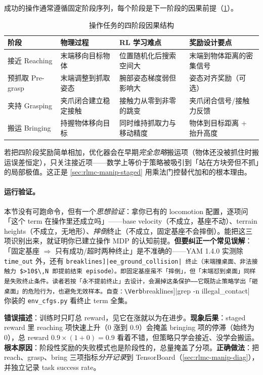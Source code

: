 成功的操作通常遵循固定阶段序列，每个阶段是下一阶段的因果前提（\cref{tab:rlmc-manip-stages}）。

\begin{table}[ht]
\centering
\small
\caption{操作任务的四阶段因果结构}
\label{tab:rlmc-manip-stages}
\begin{tabular}{@{}llll@{}}
\toprule
阶段 & 物理过程 & RL 学习难点 & 奖励设计要点 \\
\midrule
接近 Reaching & 末端移向目标物体 & 位置随机化后搜索空间大 & 末端到物体距离的密集信号 \\
预抓取 Pre-grasp & 末端调整到抓取姿态 & 腕部姿态梯度弱但影响大 & 姿态对齐奖励（可选） \\
夹持 Grasping & 夹爪闭合建立稳定接触 & 接触力从零到非零的跳变 & 夹爪闭合信号/接触力反馈 \\
搬运 Bringing & 持握物体移向目标 & 同时维持抓取力与移动精度 & 物体到目标距离 + 抬升高度 \\
\bottomrule
\end{tabular}
\end{table}

若把四阶段奖励简单相加，优化器会在早期\emph{完全忽略}搬运项（物体还没被抓住时搬运误差恒定），只关注接近项——数学上等价于策略被吸引到「站在方块旁但不抓」的局部极值。这正是 \cref{sec:rlmc-manip-staged} 用乘法门控替代加和的根本理由。

\paragraph{运行验证。}本节没有可跑命令，但有一个\emph{思想验证}：拿你已有的 locomotion 配置，逐项问「这个 term 在操作里还成立吗」——base velocity（不成立，基座不动）、terrain heights（不成立，无地形）、\emph{摔倒}终止（不成立，固定基座不会摔倒）。能把这三项识别出来，就证明你已建立操作 MDP 的认知前提。\textbf{但要纠正一个常见误解}：「固定基座 $\Rightarrow$ 只有成功/超时两种终止」是不准确的——YAM 1.4.0 实测除 \verb|time_out| 外，还有 \Verb[breaklines]|ee_ground_collision| 终止（末端撞桌面、非法接触力 $>10$\,N 即提前结束 episode）。即固定基座虽不「摔倒」，但「末端怼到桌面」同样是失败终止条件。读者若按「永不提前终止」去设计，会漏掉这条保护——它既防止策略学出「砸桌面」的危险行为，也避免无效样本。自查：\Verb[breaklines]|grep -n illegal_contact| 你装的 \verb|env_cfgs.py| 看终止 term 全集。

\begin{pitfall}
\textbf{错误描述}：训练时只盯总 reward，见它在涨就以为在进步。\textbf{现象后果}：staged reward 里 reaching 项快速上升（0 涨到 0.9）会掩盖 bringing 项的停滞（始终为 0），总 reward $0.9\times(1+0)=0.9$ 看着不错，但策略只学会接近、没学会搬运。\textbf{根本原因}：阶段性奖励的失败模式也是阶段性的，总量掩盖了分项。\textbf{正确做法}：把 reach、grasp、bring 三项指标\emph{分开记录}到 TensorBoard（\cref{sec:rlmc-manip-diag}），并独立记录 task success rate。
\end{pitfall}

